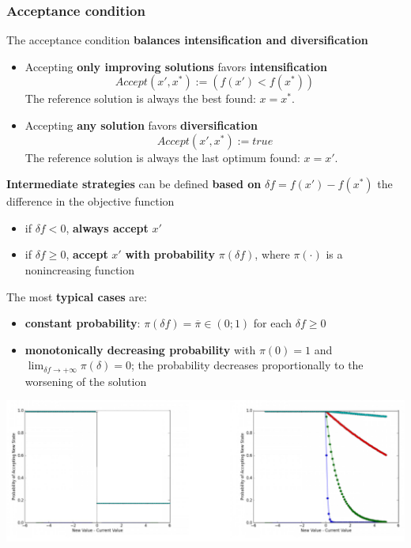 \documentclass[11pt]{article}
\begin{document}
	\subsubsection{Acceptance condition}
	The acceptance condition \textbf{balances intensification and diversification}
	\begin{itemize}
		\item Accepting \textbf{only improving solutions} favors \textbf{intensification}
		$$Accept(x', x^\ast) := (f (x') < f (x^\ast))$$
		The reference solution is always the best found: $x = x^\ast$.\\
		
		\item Accepting \textbf{any solution} favors \textbf{diversification}
		$$ Accept(x', x^\ast) := true $$
		The reference solution is always the last optimum found: $x = x'$.\\
	\end{itemize}
	
	\textbf{Intermediate strategies} can be defined \textbf{based on} $\delta f = f (x') - f (x^\ast)$ the difference in the objective function
	\begin{itemize}
		\item if $\delta f < 0$, \textbf{always accept} $x'$
		
		\item if $\delta f \geq 0$, \textbf{accept} $x'$ \textbf{with probability} $\pi (\delta f)$, where $\pi (\cdot)$ is a nonincreasing function
	\end{itemize}
	
	The most \textbf{typical cases} are:
	\begin{itemize}
		\item \textbf{constant probability}: $\pi (\delta f ) = \overline{\pi} \in (0; 1)$ for each $\delta f \geq 0$
		
		\item \textbf{monotonically decreasing probability} with $\pi (0) = 1$ and $\lim_{\delta f \rightarrow + \infty} \pi (\delta) = 0$; the probability decreases proportionally to the worsening of the solution
	\end{itemize}
	
	\begin{center}
		\includegraphics[width=\columnwidth]{img/accept1}
	\end{center}
	
\end{document}

